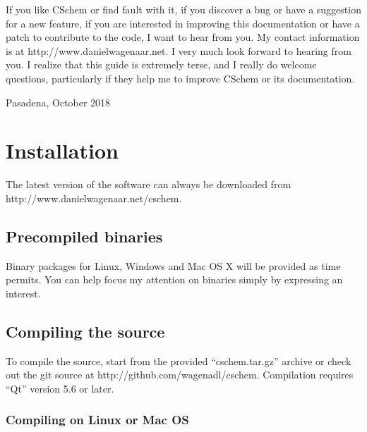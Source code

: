 \documentclass[11pt]{report}
\begin{document}
If you like CSchem or find fault with it, if you discover a bug or have a
suggestion for a new feature, if you are interested in improving this
documentation or have a patch to contribute to the code, I want to
hear from you. My contact information is at
http://www.danielwagenaar.net. I very much look forward to hearing
from you. I realize that this guide is extremely terse, and I
really do welcome questions, particularly if they help me to improve
CSchem or its documentation.\bigskip

\noindent Pasadena, October 2018

\chapter{Installation}

The latest version of the software can always be downloaded from\break
http://www.danielwagenaar.net/cschem.

\section{Precompiled binaries}

Binary packages for Linux, Windows and Mac OS X will be provided as time
permits. You can help focus my attention on binaries simply by
expressing an interest.



\section{Compiling the source}
To compile the source,  start from the provided
``cschem.tar.gz'' archive or check out the git source at
http://github.com/wagenadl/cschem. Compilation requires
``Qt'' version 5.6 or later.

\subsection{Compiling on Linux or Mac OS}
\end{document}
